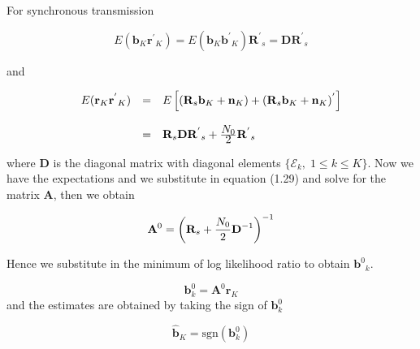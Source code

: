 For synchronous transmission

\begin{equation}
E(\mathrm{\mathbf{b}}_K\mathrm{\mathbf{r}^{'}}_K)=E(\mathrm{\mathbf{b}}_K\mathrm{\mathbf{b}^{'}}_K)\mathrm{\mathbf{R}^{'}}_s=\mathrm{\mathbf{DR}^{'}}_s
\end{equation}

and 

\begin{eqnarray}
\begin{array}{lll}
E(\mathrm{\mathbf{r}}_K\mathrm{\mathbf{r}^{'}}_K)&=&E\left [ (\mathrm{\mathbf{R}}_s\mathrm{\mathbf{b}}_K+\mathrm{\mathbf{n}}_K)+(\mathrm{\mathbf{R}}_s\mathrm{\mathbf{b}}_K+\mathrm{\mathbf{n}}_K)^{'} \right ] \\ \\
&=&\mathrm{\mathbf{R}}_s\mathrm{\mathbf{D}}\mathrm{\mathbf{R}^{'}}_s+\frac{\hbox{$N_0$}}{\hbox{$2$}}\mathrm{\mathbf{R}^{'}}_s
\end{array}
\end{eqnarray}

where \textbf{D} is the diagonal matrix with diagonal elements $\{\mathcal{E}_k,\;1\leq k \leq K\}$. Now we have the expectations and we substitute in equation (1.29) and solve for the matrix \textbf{A}, then we obtain

\begin{equation}
\mathrm{\mathbf{A}}^0=\left ( \mathrm{\mathbf{R}}_s+\frac{\hbox{$N_0$}}{\hbox{$2$}}\mathrm{\mathbf{D}}^{-1}\right )^{-1}
\end{equation}

Hence we substitute in the minimum of log likelihood ratio to obtain $\mathrm{\mathbf{b}^{0}}_k$.

\begin{equation}
\mathrm{\mathbf{b}}_k^0=\mathrm{\mathbf{A}^{0}}\mathrm{\mathbf{r}}_K
\end{equation}
and the estimates are obtained by taking the sign of $\mathrm{\mathbf{b}}_k^0$

\begin{equation}
\mathrm{\mathbf{\hat{b}}}_K=\mathrm{sgn}(\mathrm{\mathbf{b}}_k^0)
\end{equation}


